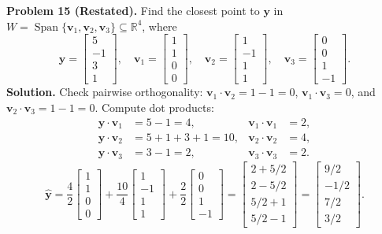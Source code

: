 \documentclass[11pt, letterpaper]{article}
\theoremstyle{definition}
\theoremstyle{remark}
\newcommand{\R}{\mathbb{R}}
\begin{document}
\medskip
\textbf{Problem 15 (Restated).} Find the closest point to $\mathbf{y}$ in $W = \operatorname{Span}\{\mathbf{v}_1, \mathbf{v}_2, \mathbf{v}_3\} \subseteq \R^4$, where
\[
\mathbf{y} = \begin{bmatrix} 5 \\ -1 \\ 3 \\ 1 \end{bmatrix}, \quad \mathbf{v}_1 = \begin{bmatrix} 1 \\ 1 \\ 0 \\ 0 \end{bmatrix}, \quad \mathbf{v}_2 = \begin{bmatrix} 1 \\ -1 \\ 1 \\ 1 \end{bmatrix}, \quad \mathbf{v}_3 = \begin{bmatrix} 0 \\ 0 \\ 1 \\ -1 \end{bmatrix}.
\]
\textbf{Solution.}
Check pairwise orthogonality: $\mathbf{v}_1 \cdot \mathbf{v}_2 = 1 - 1 = 0$, $\mathbf{v}_1 \cdot \mathbf{v}_3 = 0$, and $\mathbf{v}_2 \cdot \mathbf{v}_3 = 1 - 1 = 0$. Compute dot products:
\begin{align*}
\mathbf{y} \cdot \mathbf{v}_1 &= 5 - 1 = 4, & \mathbf{v}_1 \cdot \mathbf{v}_1 &= 2, \\
\mathbf{y} \cdot \mathbf{v}_2 &= 5 + 1 + 3 + 1 = 10, & \mathbf{v}_2 \cdot \mathbf{v}_2 &= 4, \\
\mathbf{y} \cdot \mathbf{v}_3 &= 3 - 1 = 2, & \mathbf{v}_3 \cdot \mathbf{v}_3 &= 2.
\end{align*}
\[
\hat{\mathbf{y}} = \frac{4}{2}\begin{bmatrix} 1 \\ 1 \\ 0 \\ 0 \end{bmatrix} + \frac{10}{4}\begin{bmatrix} 1 \\ -1 \\ 1 \\ 1 \end{bmatrix} + \frac{2}{2}\begin{bmatrix} 0 \\ 0 \\ 1 \\ -1 \end{bmatrix} = \begin{bmatrix} 2 + 5/2 \\ 2 - 5/2 \\ 5/2 + 1 \\ 5/2 - 1 \end{bmatrix} = \begin{bmatrix} 9/2 \\ -1/2 \\ 7/2 \\ 3/2 \end{bmatrix}.
\]
\end{document}
